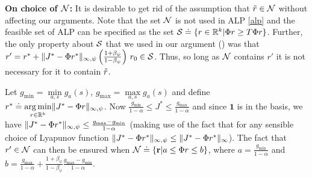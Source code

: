 \begin{appendix}
\textbf{On choice of $\N$:}
It is desirable to get rid of the assumption that $\tr\in \N$ without affecting our arguments. Note that the set $\N$ is not used in ALP \eqref{alp} and the feasible set of ALP can be specified as the set $\S\eqdef\{r\in \Re^k| \Phi r \geq T\Phi r\}$. Further, the only property about $\S$ that we used in our argument () was that $r'= r^*+\norm{J^*-\Phi r^*}_{\mn} \left(\frac{1+\beta_{\psi}}{1-\beta_{\psi}}\right)\, r_0 \in \S$. Thus, so long as $\N$ contains $r'$ it is not necessary for it to contain $\tr$.\par
Let $g_{\min}=\underset{a,s}{\min}g_a(s)$, $g_{\max}=\underset{a,s}{\max}g_a(s)$ and define $r^*\eqdef\underset{r\in \Re^k}{\arg\min}\norm{J^*-\Phi r}_{\mn}$. Now $\frac{g_{\min}}{1-\alpha}\leq J^* \leq \frac{g_{\max}}{1-\alpha}$ and since $\mathbf{1}$ is in the basis, we have $\norm{J^*-\Phi r^*}_{\mn}\leq \frac{g_{\max}-g_{\min}}{1-\alpha}$ (making use of the fact that for any sensible choice of Lyapunov function $\norm{J^*-\Phi r^*}_{\mn}\leq \norm{J^*-\Phi r^*}_{\infty}$).  The fact that $r'\in \N$ can then be ensured when $\N\eqdef\{\r| a\leq \Phi r\leq b\}$, where $a=\frac{g_{\min}}{1-\alpha}$ and $b=\frac{g_{\max}}{1-\alpha}+\frac{1+\beta_{\psi}}{1-\beta_{\psi}}\frac{g_{\max}-g_{\min}}{1-\alpha}$.
\end{appendix}
